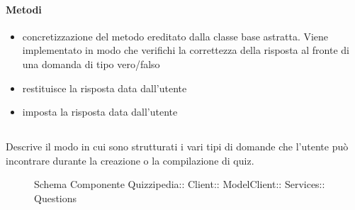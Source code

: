 \paragraph{Metodi}
\begin{itemize}
\item {}
\newline
concretizzazione del metodo ereditato dalla classe base astratta. Viene implementato in modo che verifichi la correttezza della risposta al fronte di una domanda di tipo vero/falso
\newline
\item {}
\newline
restituisce la risposta data dall'utente
\newline
\item {}
\newline
imposta la risposta data dall'utente
\newline
\end{itemize}
\subsection{}
Descrive il modo in cui sono strutturati i vari tipi di domande che l'utente può incontrare durante la creazione o la compilazione di quiz.
\begin{figure}[H]
\centering
\noindent{}
\caption[Schema Componente Quizzipedia::Client::ModelClient::Services::Questions]{Schema Componente Quizzipedia:: Client:: ModelClient:: Services:: Questions}
\end{figure}
